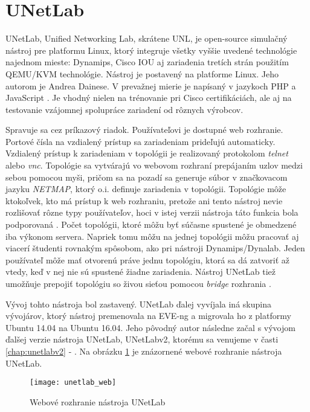 \section{UNetLab}

UNetLab, Unified Networking Lab, skrátene UNL, je open-source  simulačný nástroj pre platformu Linux, ktorý integruje všetky vyššie uvedené technológie najednom mieste: Dynamips, Cisco IOU aj zariadenia tretích strán použitím QEMU/KVM technológie. Nástroj je postavený na platforme Linux. Jeho autorom je Andrea Dainese. V prevažnej mierie je napísaný v jazykoch PHP a JavaScript \cite{webiou_unetlab_unetlabv2, unetlab_github}. Je vhodný nielen na trénovanie pri Cisco certifikáciách, ale aj na testovanie vzájomnej spolupráce zariadení od rôznych výrobcov.

Spravuje sa cez príkazový riadok. Používateľovi je dostupné web rozhranie. Portové čísla na vzdialený prístup sa zariadeniam prideľujú automaticky. Vzdialený prístup k zariadeniam v topológii je realizovaný protokolom \emph{telnet} alebo \emph{vnc}. Topológie sa vytvárajú vo webovom rozhraní prepájaním uzlov medzi sebou pomocou myši, pričom sa na pozadí sa generuje súbor v značkovacom jazyku \emph{NETMAP}, ktorý o.i. definuje zariadenia v topológii. Topológie môže ktokoľvek, kto má prístup k web rozhraniu, pretože ani tento nástroj nevie rozlišovať rôzne typy používateľov, hoci v istej verzii nástroja táto funkcia bola podporovaná \cite{unetlab_github}. Počet topológii, ktoré môžu byť súčasne spustené je obmedzené iba výkonom servera. Napriek tomu môžu na jednej topológii môžu pracovať aj viacerí študenti rovnakým spôsobom, ako pri nástroji Dynamips/Dynalab. Jeden používateľ môže mať otvorenú práve jednu topológiu, ktorá sa dá zatvoriť až vtedy, keď v nej nie sú spustené žiadne zariadenia. Nástroj UNetLab tiež umožňuje prepojiť topológiu so živou sieťou pomocou \emph{bridge} rozhrania \cite{webiou_real_network}.

Vývoj tohto nástroja bol zastavený. UNetLab ďalej vyvíjala iná skupina vývojárov, ktorý nástroj premenovala na EVE-ng a migrovala ho z platformy Ubuntu 14.04 na Ubuntu 16.04. Jeho pôvodný autor následne začal s vývojom ďalšej verzie nástroja UNetLab, UNetLabv2, ktorému sa venujeme v časti \ref{chap:unetlabv2} - . Na obrázku \ref{obr:unetlab_web} je znázornené webové rozhranie nástroja UNetLab.

\begin{figure}
    \centering
    \texttt{[image: unetlab\_web]}
    \caption{Webové rozhranie nástroja UNetLab}
    \cite{obr_unetlab_web}
    \label{obr:unetlab_web}
\end{figure}





